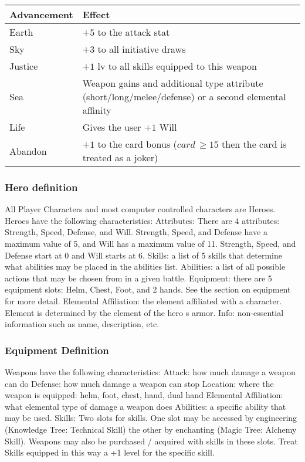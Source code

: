 \begin{center}
\begin{tabularx}{\textwidth}{X X}
\hline
Advancement & Effect\\
\hline
Earth & $+5$ to the attack stat\\
Sky & $+3$ to all initiative draws \\
Justice & $+1$ lv to all skills equipped to this weapon\\
Sea & Weapon gains and additional type attribute (short/long/melee/defense) or a second elemental affinity \\
Life & Gives the user $+1$ Will\\
Abandon & $+ 1$ to the card bonus ($card\, \geq15$ then the card is treated as a joker) \\
\hline
\end{tabularx}
\end{center}

\subsubsection{Hero definition}

All Player Characters and most computer controlled characters are Heroes.
Heroes have the following characteristics: Attributes: There are 4 attributes:
Strength, Speed, Defense, and Will. Strength, Speed, and Defense have a maximum value
of 5, and Will has a maximum value of 11. Strength, Speed, and Defense start at 0
and Will starts at 6.  Skills: a list of 5 skills that determine what abilities
may be placed in the abilities list.  Abilities: a list of all possible actions
that may be chosen from in a given battle.  Equipment: there are 5 equipment
slots: Helm, Chest, Foot, and 2 hands.  See the section on equipment for more
detail.  Elemental Affiliation: the element affiliated with a character.
Element is determined by the element of the hero s armor.  Info: non-essential
information such as name, description, etc.
\subsubsection{Equipment Definition}

Weapons have the following characteristics:
Attack: how much damage a weapon can do
Defense: how much damage a weapon can stop
Location: where the weapon is equipped: helm, foot, chest, hand, dual hand
Elemental Affiliation: what elemental type of damage a weapon does
Abilities: a specific ability that may be used.
Skills: Two slots for skills.  One slot may be accessed by engineering
(Knowledge Tree: Technical Skill) the other by enchanting (Magic Tree: Alchemy
Skill).  Weapons may also be purchased
/ acquired with skills in these slots.  Treat Skills equipped in this way a 
+1 level for the specific skill.
